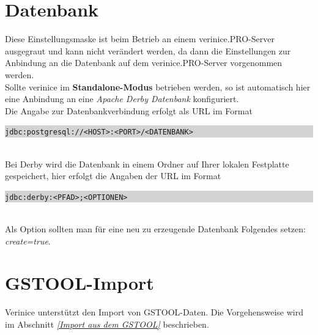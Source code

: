 \documentclass[a4paper,10pt]{book}
\begin{document}
\section{Datenbank} \label{sec:datenbank}
Diese Einstellungsmaske ist beim Betrieb an einem verinice.\textsc{PRO}-Server ausgegraut und kann nicht verändert werden, da dann die Einstellungen zur
Anbindung an die Datenbank auf dem verinice.\textsc{PRO}-Server vorgenommen werden.
\newline\\
Sollte verinice im \textbf{Standalone-Modus} betrieben werden, so ist automatisch hier eine Anbindung an eine {\em Apache Derby Datenbank} konfiguriert.
\newline\\
Die Angabe zur Datenbankverbindung erfolgt als URL im Format
\newline\\
\colorbox{lightgray}{\parbox{\textwidth}{
{\tt jdbc:postgresql://<HOST>:<PORT>/<DATENBANK>}
}}
\newline\\
Bei Derby wird die Datenbank in einem Ordner auf Ihrer lokalen Festplatte gespeichert, hier erfolgt die Angaben der URL im Format
\newline\\
\colorbox{lightgray}{\parbox{\textwidth}{
{\tt jdbc:derby:<PFAD>;<OPTIONEN>}
}}
\newline\\
Als Option sollten man für eine neu zu erzeugende Datenbank Folgendes setzen: {\em create=true}.

\section{GSTOOL-Import}
Verinice unterstützt den Import von \textsc{GSTOOL}-Daten. Die Vorgehensweise wird im Abschnitt {\em \ref{Import aus dem GSTOOL} } beschrieben.
\end{document}

